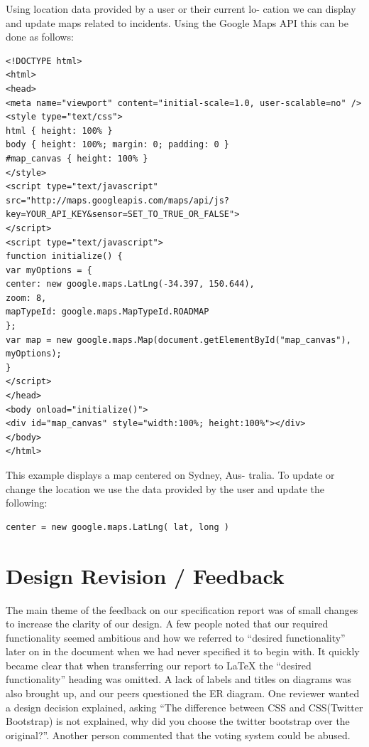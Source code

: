 \documentclass{sig-alt-release2}
\begin{document}
Using location data provided by a user or their current lo-
cation we can display and update maps related to incidents.
Using the Google Maps API this can be done as follows:

\tiny
\begin{verbatim}
<!DOCTYPE html>
<html>
<head>
<meta name="viewport" content="initial-scale=1.0, user-scalable=no" />
<style type="text/css">
html { height: 100% }
body { height: 100%; margin: 0; padding: 0 }
#map_canvas { height: 100% }
</style>
<script type="text/javascript"
src="http://maps.googleapis.com/maps/api/js?key=YOUR_API_KEY&sensor=SET_TO_TRUE_OR_FALSE">
</script>
<script type="text/javascript">
function initialize() {
var myOptions = {
center: new google.maps.LatLng(-34.397, 150.644),
zoom: 8,
mapTypeId: google.maps.MapTypeId.ROADMAP
};
var map = new google.maps.Map(document.getElementById("map_canvas"),
myOptions);
}
</script>
</head>
<body onload="initialize()">
<div id="map_canvas" style="width:100%; height:100%"></div>
</body>
</html>
\end{verbatim}
\normalsize

This example displays a map centered on Sydney, Aus-
tralia. To update or change the location we use the data
provided by the user and update the following:

\begin{verbatim}
center = new google.maps.LatLng( lat, long )
\end{verbatim}

\newpage
\section{Design Revision / Feedback}
The main theme of the feedback on our specification report was of small changes to increase the clarity of our design. A few people noted that our required functionality seemed ambitious and how we referred to ``desired functionality'' later on in the document when we had never specified it to begin with. It quickly became clear that when transferring our report to LaTeX the ``desired functionality'' heading was omitted. A lack of labels and titles on diagrams was also brought up, and our peers questioned the ER diagram.  One reviewer wanted a design decision explained, asking ``The difference between CSS and CSS(Twitter Bootstrap) is not explained, why did you choose the twitter bootstrap over the original?''. Another person commented that the voting system could be abused.
\end{document}
